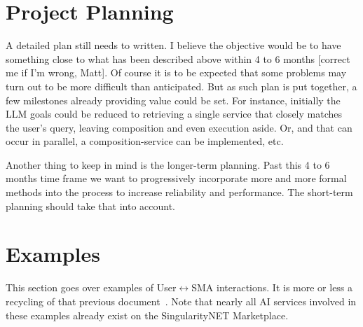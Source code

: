 \documentclass[]{article}
\begin{document}
\section{Project Planning}
A detailed plan still needs to written.  I believe the objective would
be to have something close to what has been described above within 4
to 6 months [correct me if I'm wrong, Matt].  Of course it is to be
expected that some problems may turn out to be more difficult than
anticipated.  But as such plan is put together, a few milestones
already providing value could be set.  For instance, initially the LLM
goals could be reduced to retrieving a single service that closely
matches the user's query, leaving composition and even execution
aside.  Or, and that can occur in parallel, a composition-service can
be implemented, etc.

Another thing to keep in mind is the longer-term planning.  Past this
4 to 6 months time frame we want to progressively incorporate more and
more formal methods into the process to increase reliability and
performance.  The short-term planning should take that into account.

\section{Examples}
This section goes over examples of User$\leftrightarrow$SMA
interactions.  It is more or less a recycling of that previous
document~\cite{Assemblage2022}.  Note that nearly all AI services
involved in these examples already exist on the SingularityNET
Marketplace.
\end{document}
